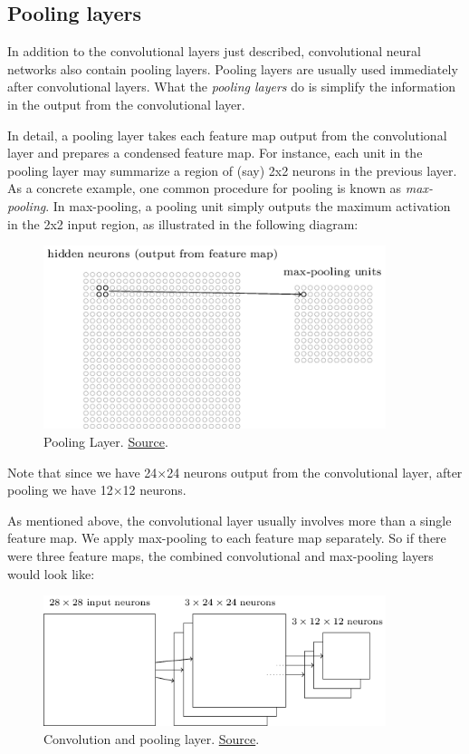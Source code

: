 \documentclass[a4paper]{tufte-handout}
\begin{document}
\subsection{Pooling layers}

In addition to the convolutional layers just described, convolutional
neural networks also contain pooling layers. Pooling layers are usually
used immediately after convolutional layers. What the \emph{pooling
layers} do is simplify the information in the output from the
convolutional layer.

In detail, a pooling layer takes each feature map output from the
convolutional layer and prepares a condensed feature map. For instance,
each unit in the pooling layer may summarize a region of (say) 2x2
neurons in the previous layer. As a concrete example, one common
procedure for pooling is known as \emph{max-pooling}. In max-pooling, a
pooling unit simply outputs the maximum activation in the 2x2 input
region, as illustrated in the following diagram:

\begin{figure}
\includegraphics[width=100mm]{max_pooling}
\caption{Pooling Layer.
\href{http://neuralnetworksanddeeplearning.com/chap6.html}{Source}. }
\end{figure}

Note that since we have 24×24 neurons output from the convolutional
layer, after pooling we have 12×12 neurons.

As mentioned above, the convolutional layer usually involves more than a
single feature map. We apply max-pooling to each feature map separately.
So if there were three feature maps, the combined convolutional and
max-pooling layers would look like:

\begin{figure}
\includegraphics[width=100mm]{max_pooling2}
\caption{Convolution and pooling layer.
\href{http://neuralnetworksanddeeplearning.com/chap6.html}{Source}. }
\end{figure}
\end{document}

